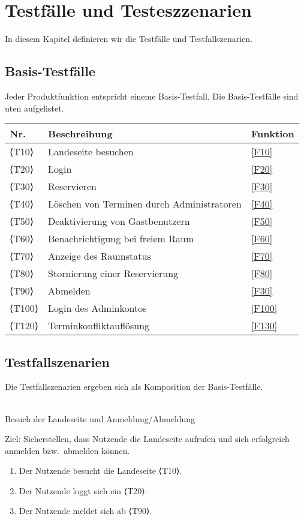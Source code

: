 \chapter{Testfälle und Testeszzenarien}
\label{chap:test}
In diesem Kapitel definieren wir die Testfälle und Testfallszenarien.

\section{Basis-Testfälle}

Jeder Produktfunktion entspricht eineme Basis-Testfall. Die Basis-Testfälle sind uten aufgelistet.


\begin{table}[htbp]


  \centering
  \begin{tabularx}{\textwidth}{ l|X|l }
      \textbf{Nr.} & \textbf{Beschreibung} & \textbf{Funktion} \\ \hline\hline
      ⟨T10⟩ & Landeseite besuchen &\ref{F10}\\
      ⟨T20⟩ & Login &\ref{F20} \\
      ⟨T30⟩ & Reservieren &\ref{F30} \\
      ⟨T40⟩ & Löschen von Terminen durch Administratoren &\ref{F40} \\
      ⟨T50⟩ & Deaktivierung von Gastbenutzern &\ref{F50} \\
      ⟨T60⟩ & Benachrichtigung bei freiem Raum &\ref{F60} \\
      ⟨T70⟩ & Anzeige des Raumstatus &\ref{F70} \\
      ⟨T80⟩ & Stornierung einer Reservierung &\ref{F80} \\
      ⟨T90⟩ & Abmelden &\ref{F30} \\
      ⟨T100⟩& Login des Adminkontos &\ref{F100} \\
      ⟨T120⟩ & Terminkonfliktauflösung &\ref{F130} \\
  \end{tabularx}\label{tab:test_table}
\end{table}

\section{Testfallszenarien}
Die Testfallszenarien ergeben sich als Komposition der Basis-Testfälle.\\ \\
\begin{scenario}{10}{Besuch der Landeseite und Anmeldung/Abmeldung}
  \item[Ziel:] Sicherstellen, dass Nutzende die Landeseite aufrufen und sich erfolgreich anmelden bzw.\ abmelden können.
  \begin{enumerate}
    \item Der Nutzende besucht die Landeseite ⟨T10⟩.
    \item Der Nutzende loggt sich ein ⟨T20⟩.
    \item Der Nutzende meldet sich ab ⟨T90⟩.
  \end{enumerate}
\end{scenario}

